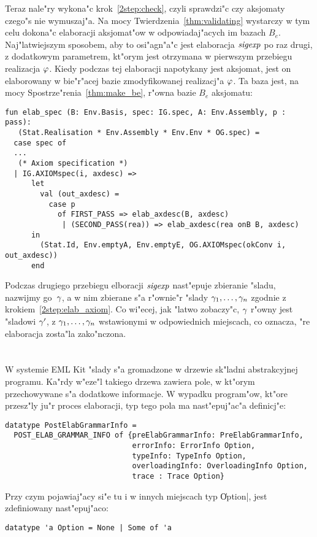 Teraz nale"ry wykona"c krok~\ref{2step:check}, 
czyli sprawdzi"c czy aksjomaty czego"s nie wymuszaj"a.
Na mocy Twierdzenia~\ref{thm:validating} wystarczy w tym celu
dokona"c elaboracji aksjomat"ow w odpowiadaj"acych im bazach $B_e$.
Naj"latwiejszym sposobem, aby to osi"agn"a"c jest elaboracja
${\it sigexp}$ po raz drugi, z dodatkowym parametrem, kt"orym jest 
otrzymana w pierwszym przebiegu realizacja $\varphi$. 
Kiedy podczas tej elaboracji napotykany jest
aksjomat, jest on elaborowany w bie"r"acej bazie
zmodyfikowanej realizacj"a $\varphi$.
Ta baza jest, na mocy Spostrze"renia~\ref{thm:make_be},
r"owna bazie $B_e$ aksjomatu:
{\small
\begin{verbatim}
fun elab_spec (B: Env.Basis, spec: IG.spec, A: Env.Assembly, p : pass): 
   (Stat.Realisation * Env.Assembly * Env.Env * OG.spec) =
  case spec of
  ...
   (* Axiom specification *)
  | IG.AXIOMspec(i, axdesc) =>
      let
        val (out_axdesc) = 
          case p
            of FIRST_PASS => elab_axdesc(B, axdesc)
             | (SECOND_PASS(rea)) => elab_axdesc(rea onB B, axdesc)
      in
        (Stat.Id, Env.emptyA, Env.emptyE, OG.AXIOMspec(okConv i, out_axdesc))
      end
\end{verbatim}
}

Podczas drugiego przebiegu elboracji ${\it sigexp}$ nast"epuje zbieranie "sladu,
nazwijmy go~$\gamma$, a w nim zbierane s"a r"ownie"r "slady
$\gamma_1,\dots,\gamma_n$ zgodnie z krokiem~\ref{2step:elab_axiom}.
Co wi"ecej, jak "latwo zobaczy"c, $\gamma$ r"owny jest "sladowi $\gamma'$, 
z $\gamma_1,\dots,\gamma_n$ wstawionymi w odpowiednich miejscach, 
co oznacza, "re elaboracja zosta"la zako"nczona.

\section{\secimpltracesmod}
\label{sec:impl_traces_mod}

W systemie EML Kit "slady s"a gromadzone w drzewie sk"ladni abstrakcyjnej programu.
Ka"rdy w"eze"l takiego drzewa zawiera pole, w kt"orym przechowywane s"a dodatkowe informacje.
W wypadku program"ow, kt"ore przesz"ly ju"r proces elaboracji,
typ tego pola ma nast"epuj"ac"a definicj"e:
{\small
\begin{verbatim}
datatype PostElabGrammarInfo =
  POST_ELAB_GRAMMAR_INFO of {preElabGrammarInfo: PreElabGrammarInfo,
                             errorInfo: ErrorInfo Option,
                             typeInfo: TypeInfo Option,
                             overloadingInfo: OverloadingInfo Option,
                             trace : Trace Option}
\end{verbatim}
}
Przy czym pojawiaj"acy si"e tu i w innych miejscach typ \|Option|,
jest zdefiniowany nast"epuj"aco:
{\small
\begin{verbatim}
datatype 'a Option = None | Some of 'a 
\end{verbatim}
}

